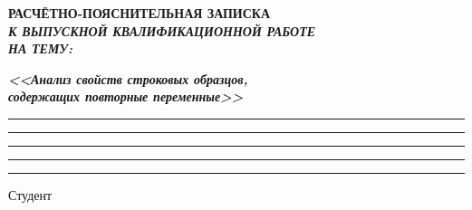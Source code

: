 \documentclass[14pt, russian]{scrartcl}
\begin{document}
\sloppy

\def\figurename{Рисунок}

\makeatletter
\let\c@algorithm\c@listing
\makeatother

\begin{titlepage}
\thispagestyle{empty}
\newpage

\bmstuheader

\vspace{3em}

\begin{center}
  \Large \bf{РАСЧЁТНО-ПОЯСНИТЕЛЬНАЯ ЗАПИСКА\\
  \textbf{\textit{К ВЫПУСКНОЙ КВАЛИФИКАЦИОННОЙ РАБОТЕ\\НА ТЕМУ:}}\\}
\end{center}

\vspace*{-6ex}
\begin{center}
  \Large{\textit{\textbf{<<Анализ свойств строковых образцов,\\
  содержащих повторные переменные>>}}}

  \vspace*{-3ex}
  \rule{1\textwidth}{1.2pt}
  \vspace*{-0.2ex}\rule{1\textwidth}{1.2pt}
  \vspace*{-0.2ex}\rule{1\textwidth}{1.2pt}
  \vspace*{-0.2ex}\rule{1\textwidth}{1.2pt}
  \vspace*{-0.2ex}\rule{1\textwidth}{1.2pt}
\end{center}

\vspace{\fill}

\newlength{\ML}

\noindent Студент \underline{\hspace{1.5cm}} \hfill
\underline{\hspace{4cm}}\quad\underline{\hspace{4cm}}


\end{titlepage}
\end{document}

